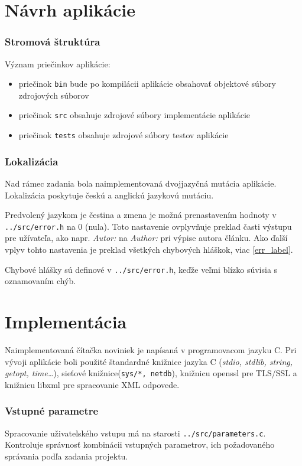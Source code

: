 \chapter{Návrh aplikácie}
\subsection*{Stromová štruktúra}
\hfill \break
\noindent Význam priečinkov aplikácie:
\begin{itemize}
  \item{priečinok {\tt bin} bude po kompilácii aplikácie obsahovať objektové súbory zdrojových súborov}
  \item{priečinok {\tt src} obsahuje zdrojové súbory implementácie aplikácie}
  \item{priečinok {\tt tests} obsahuje zdrojové súbory testov aplikácie}
\end{itemize}

\subsection*{Lokalizácia}
Nad rámec zadania bola naimplementovaná dvojjazyčná mutácia aplikácie. Lokalizácia poskytuje českú a anglickú jazykovú mutáciu.

Predvolený jazykom je čestina a zmena je možná prenastavením hodnoty  v {\tt ../src/error.h} na 0 (nula). Toto nastavenie ovplyvňuje preklad časti výstupu pre užívateľa, ako napr. {\it Autor:} na {\it Author:} pri výpise autora článku. Ako ďalší vplyv tohto nastavenia je preklad všetkých chybových hláškok, viac \ref{err_label}.

Chybové hlášky sú definové v {\tt ../src/error.h}, keďže veľmi blízko súvisia s oznamovaním chýb.

\chapter{Implementácia}
Naimplementovaná čítačka noviniek je napísaná v programovacom jazyku C. Pri vývoji aplikácie boli použité štandardné knižnice jazyka C ({\it stdio, stdlib, string, getopt, time\dots}), sieťové knižnice({\tt sys/*, netdb}), knižnicu openssl pre TLS/SSL a knižnicu libxml pre spracovanie XML odpovede.
\subsection*{Vstupné parametre}
Spracovanie uživatelského vstupu má na starosti {\tt ../src/parameters.c}. Kontroluje správnosť kombinácii vstupných parametrov, ich požadovaného správania podľa zadania projektu.

